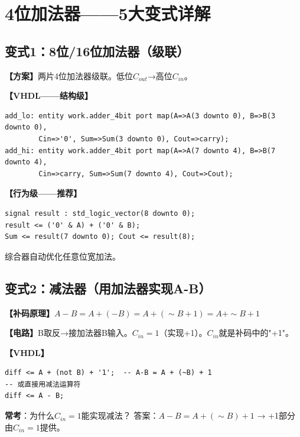 \chapter{4位加法器——5大变式详解}

\section{变式1：8位/16位加法器（级联）}

\begin{detailbox}[完整教学]
\textbf{【方案】}两片4位加法器级联。低位$C_{out}$→高位$C_{in}$。

\textbf{【VHDL——结构级】}
\begin{lstlisting}
add_lo: entity work.adder_4bit port map(A=>A(3 downto 0), B=>B(3 downto 0),
        Cin=>'0', Sum=>Sum(3 downto 0), Cout=>carry);
add_hi: entity work.adder_4bit port map(A=>A(7 downto 4), B=>B(7 downto 4),
        Cin=>carry, Sum=>Sum(7 downto 4), Cout=>Cout);
\end{lstlisting}

\textbf{【行为级——推荐】}
\begin{lstlisting}
signal result : std_logic_vector(8 downto 0);
result <= ('0' & A) + ('0' & B);
Sum <= result(7 downto 0); Cout <= result(8);
\end{lstlisting}
综合器自动优化任意位宽加法。
\end{detailbox}


\section{变式2：减法器（用加法器实现A-B）}

\begin{detailbox}[完整教学]
\textbf{【补码原理】}$A-B = A+(-B) = A+(\sim B+1) = A+\sim B+1$

\textbf{【电路】}B取反→接加法器B输入。$C_{in}=1$（实现+1）。$C_{in}$就是补码中的"+1"。

\textbf{【VHDL】}
\begin{lstlisting}
diff <= A + (not B) + '1';  -- A-B = A + (~B) + 1
-- 或直接用减法运算符
diff <= A - B;
\end{lstlisting}

\begin{examfocus}
\textbf{常考}：为什么$C_{in}=1$能实现减法？
答案：$A-B = A+(\sim B)+1$ → +1部分由$C_{in}=1$提供。
\end{examfocus}
\end{detailbox}


